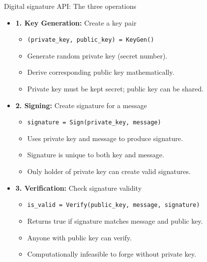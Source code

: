 \documentclass[aspectratio=169, lualatex, handout]{beamer}
\begin{document}
\begin{frame}{Digital signature API: The three operations}
	\begin{itemize}
		\item \textbf{1. Key Generation:} Create a key pair
		      \begin{itemize}
			      \item \texttt{(private\_key, public\_key) = KeyGen()}
			      \item Generate random private key (secret number).
			      \item Derive corresponding public key mathematically.
			      \item Private key must be kept secret; public key can be shared.
		      \end{itemize}
		\item \textbf{2. Signing:} Create signature for a message
		      \begin{itemize}
			      \item \texttt{signature = Sign(private\_key, message)}
			      \item Uses private key and message to produce signature.
			      \item Signature is unique to both key and message.
			      \item Only holder of private key can create valid signatures.
		      \end{itemize}
		\item \textbf{3. Verification:} Check signature validity
		      \begin{itemize}
			      \item \texttt{is\_valid = Verify(public\_key, message, signature)}
			      \item Returns true if signature matches message and public key.
			      \item Anyone with public key can verify.
			      \item Computationally infeasible to forge without private key.
		      \end{itemize}
	\end{itemize}
\end{frame}
\end{document}
